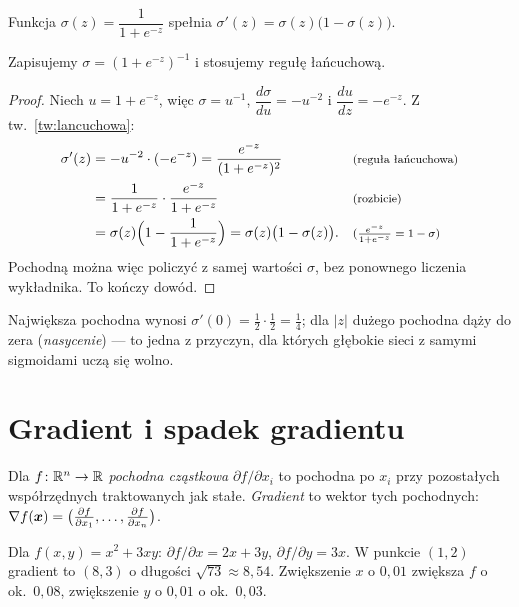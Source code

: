 \begin{twierdzenie}\label{tw:pochodna-sigmoidy}
Funkcja $\sigma(z)=\dfrac{1}{1+e^{-z}}$ spełnia $\sigma'(z)=\sigma(z)\big(1-\sigma(z)\big)$.
\end{twierdzenie}
\begin{pomyslDowodu}
Zapisujemy $\sigma=(1+e^{-z})^{-1}$ i stosujemy regułę łańcuchową.
\end{pomyslDowodu}
\begin{proof}
Niech $u=1+e^{-z}$, więc $\sigma=u^{-1}$, $\dfrac{d\sigma}{du}=-u^{-2}$ i $\dfrac{du}{dz}=-e^{-z}$. Z tw.~\ref{tw:lancuchowa}:
\begin{align*}
\sigma'(z) &= -u^{-2}\cdot(-e^{-z})=\frac{e^{-z}}{(1+e^{-z})^2} && \text{\footnotesize (reguła łańcuchowa)}\\
 &= \frac{1}{1+e^{-z}}\cdot\frac{e^{-z}}{1+e^{-z}} && \text{\footnotesize (rozbicie)}\\
 &= \sigma(z)\Big(1-\frac{1}{1+e^{-z}}\Big)=\sigma(z)\big(1-\sigma(z)\big). && \text{\footnotesize ($\tfrac{e^{-z}}{1+e^{-z}}=1-\sigma$)}
\end{align*}
Pochodną można więc policzyć z samej wartości $\sigma$, bez ponownego liczenia wykładnika. To kończy dowód.
\end{proof}

Największa pochodna wynosi $\sigma'(0)=\tfrac12\cdot\tfrac12=\tfrac14$; dla $|z|$ dużego pochodna dąży do zera
(\emph{nasycenie}) --- to jedna z przyczyn, dla których głębokie sieci z samymi sigmoidami uczą się wolno.

\section{Gradient i spadek gradientu}

\begin{definicja}\label{def:gradient}
Dla $f\colon\mathbb{R}^n\to\mathbb{R}$ \emph{pochodna cząstkowa} $\partial f/\partial x_i$ to pochodna po $x_i$ przy pozostałych współrzędnych
traktowanych jak stałe. \emph{Gradient} to wektor tych pochodnych:
$\nabla f(\bm{x})=\big(\tfrac{\partial f}{\partial x_1},\dots,\tfrac{\partial f}{\partial x_n}\big)$.
\end{definicja}

\begin{przyklad}\label{prz:gradient}
Dla $f(x,y)=x^2+3xy$: $\partial f/\partial x=2x+3y$, $\partial f/\partial y=3x$. W punkcie $(1,2)$ gradient to $(8,3)$
o długości $\sqrt{73}\approx8{,}54$. Zwiększenie $x$ o $0{,}01$ zwiększa $f$ o ok.\ $0{,}08$, zwiększenie $y$ o $0{,}01$ o ok.\ $0{,}03$.
\end{przyklad}

